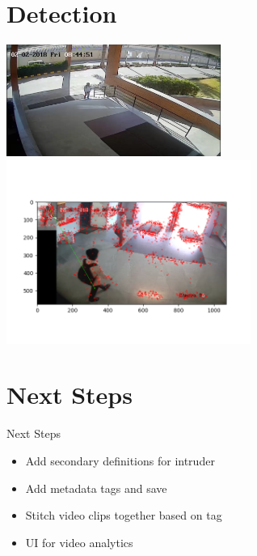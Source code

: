\documentclass{beamer}
\begin{document}
\section{Detection}
\begin{frame}{}
  \begin{center}
    \includegraphics[width=7cm,keepaspectratio]{Untitled.png}
    \newline
     \includegraphics[width=8cm,keepaspectratio]{match.png}
  \end{center}
\end{frame}



\section{Next Steps} 
\begin{frame}{Next Steps}
  \begin{itemize}
   
    \item Add secondary definitions for intruder
    \newline
    \item Add metadata tags and save 
    \newline
    \item Stitch video clips together based on tag
    \newline
    \item UI for video analytics
	\newline

  \end{itemize}
\end{frame}
\end{document}
